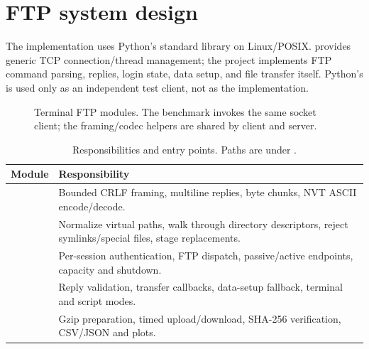 \section{FTP system design}\label{sec:ftp-design}

The implementation uses Python's standard library on Linux/POSIX.  provides generic TCP connection/thread management; the project implements FTP command parsing, replies, login state, data setup, and file transfer itself. Python's  is used only as an independent test client, not as the implementation.

\begin{figure}[htbp]
\centering
{}
\caption{Terminal FTP modules. The benchmark invokes the same socket client; the framing/codec helpers are shared by client and server.}
\label{fig:ftp-modules}
\end{figure}

\begin{table}[htbp]
\centering\small
\caption{Responsibilities and entry points. Paths are under .}
\begin{tabularx}{\linewidth}{@{}l Y@{}}
\toprule
Module & Responsibility \\
\midrule
{} & Bounded CRLF framing, multiline replies, byte chunks, NVT ASCII encode/decode. \\
 & Normalize virtual paths, walk through directory descriptors, reject symlinks/special files, stage replacements. \\
 & Per-session authentication, FTP dispatch, passive/active endpoints, capacity and shutdown. \\
 & Reply validation, transfer callbacks, data-setup fallback, terminal and script modes. \\
 & Gzip preparation, timed upload/download, SHA-256 verification, CSV/JSON and plots. \\
\bottomrule
\end{tabularx}
\end{table}

